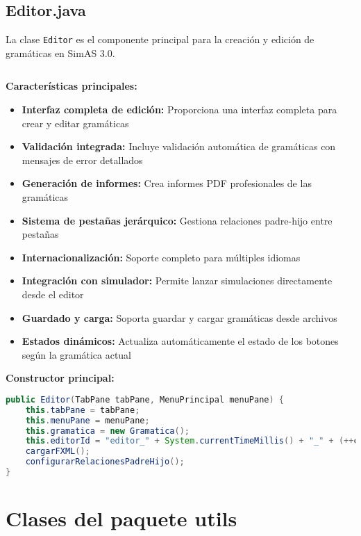 \subsection{Editor.java}

La clase \texttt{Editor} es el componente principal para la creación y edición de gramáticas en SimAS 3.0.

\inputminted[linenos,breaklines,firstline=1,lastline=150]{java}{codigo/src/editor/Editor.java}

\textbf{Características principales:}

\begin{itemize}
    \item \textbf{Interfaz completa de edición:} Proporciona una interfaz completa para crear y editar gramáticas
    \item \textbf{Validación integrada:} Incluye validación automática de gramáticas con mensajes de error detallados
    \item \textbf{Generación de informes:} Crea informes PDF profesionales de las gramáticas
    \item \textbf{Sistema de pestañas jerárquico:} Gestiona relaciones padre-hijo entre pestañas
    \item \textbf{Internacionalización:} Soporte completo para múltiples idiomas
    \item \textbf{Integración con simulador:} Permite lanzar simulaciones directamente desde el editor
    \item \textbf{Guardado y carga:} Soporta guardar y cargar gramáticas desde archivos
    \item \textbf{Estados dinámicos:} Actualiza automáticamente el estado de los botones según la gramática actual
\end{itemize}

\textbf{Constructor principal:}

\begin{lstlisting}[language=Java, caption=Constructor principal del Editor]
public Editor(TabPane tabPane, MenuPrincipal menuPane) {
    this.tabPane = tabPane;
    this.menuPane = menuPane;
    this.gramatica = new Gramatica();
    this.editorId = "editor_" + System.currentTimeMillis() + "_" + (++contadorEditores);
    cargarFXML();
    configurarRelacionesPadreHijo();
}
\end{lstlisting}

\section{Clases del paquete utils}

